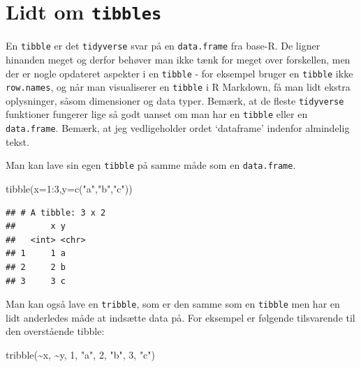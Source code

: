\documentclass[
]{book}
\newenvironment{Shaded}{\begin{snugshade}}{\end{snugshade}}
\newcommand{\AttributeTok}[1]{\textcolor[rgb]{0.77,0.63,0.00}{#1}}
\newcommand{\DecValTok}[1]{\textcolor[rgb]{0.00,0.00,0.81}{#1}}
\newcommand{\FunctionTok}[1]{\textcolor[rgb]{0.00,0.00,0.00}{#1}}
\newcommand{\NormalTok}[1]{#1}
\newcommand{\SpecialCharTok}[1]{\textcolor[rgb]{0.00,0.00,0.00}{#1}}
\newcommand{\StringTok}[1]{\textcolor[rgb]{0.31,0.60,0.02}{#1}}
\begin{document}
\hypertarget{lidt-om-tibbles}{%
\section{\texorpdfstring{Lidt om \texttt{tibbles}}{Lidt om tibbles}}\label{lidt-om-tibbles}}

En \texttt{tibble} er det \texttt{tidyverse} svar på en \texttt{data.frame} fra base-R. De ligner hinanden meget og derfor behøver man ikke tænk for meget over forskellen, men der er nogle opdateret aspekter i en \texttt{tibble} - for eksempel bruger en \texttt{tibble} ikke \texttt{row.names}, og når man visualiserer en \texttt{tibble} i R Markdown, få man lidt ekstra oplysninger, såsom dimensioner og data typer. Bemærk, at de fleste \texttt{tidyverse} funktioner fungerer lige så godt uanset om man har en \texttt{tibble} eller en \texttt{data.frame}. Bemærk, at jeg vedligeholder ordet `dataframe' indenfor almindelig tekst.

Man kan lave sin egen \texttt{tibble} på samme måde som en \texttt{data.frame}.

\begin{Shaded}
\begin{Highlighting}[]
\FunctionTok{tibble}\NormalTok{(}\AttributeTok{x=}\DecValTok{1}\SpecialCharTok{:}\DecValTok{3}\NormalTok{,}\AttributeTok{y=}\FunctionTok{c}\NormalTok{(}\StringTok{"a"}\NormalTok{,}\StringTok{"b"}\NormalTok{,}\StringTok{"c"}\NormalTok{))}
\end{Highlighting}
\end{Shaded}

\begin{verbatim}
## # A tibble: 3 x 2
##       x y    
##   <int> <chr>
## 1     1 a    
## 2     2 b    
## 3     3 c
\end{verbatim}

Man kan også lave en \texttt{tribble}, som er den samme som en \texttt{tibble} men har en lidt anderledes måde at indsætte data på. For eksempel er følgende tilsvarende til den overstående tibble:

\begin{Shaded}
\begin{Highlighting}[]
\FunctionTok{tribble}\NormalTok{(}\SpecialCharTok{\textasciitilde{}}\NormalTok{x, }\SpecialCharTok{\textasciitilde{}}\NormalTok{y,}
       \DecValTok{1}\NormalTok{, }\StringTok{"a"}\NormalTok{,}
       \DecValTok{2}\NormalTok{, }\StringTok{"b"}\NormalTok{,}
       \DecValTok{3}\NormalTok{, }\StringTok{"c"}\NormalTok{)}
\end{Highlighting}
\end{Shaded}
\end{document}

